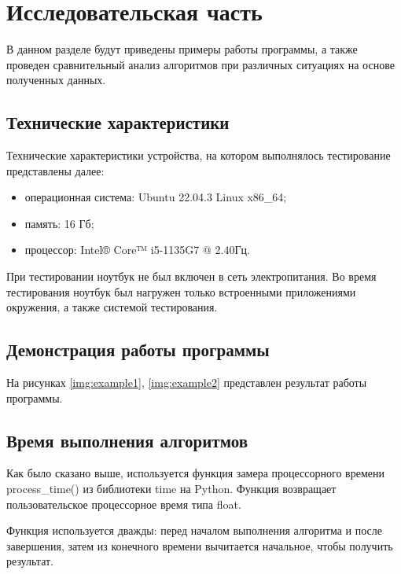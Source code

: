 \chapter{Исследовательская часть}

В данном разделе будут приведены примеры работы программы, а также проведен сравнительный анализ алгоритмов при различных ситуациях на основе полученных данных.

\section{Технические характеристики}

Технические характеристики устройства, на котором выполнялось тестирование представлены далее:

\begin{itemize}
    \item операционная система: Ubuntu 22.04.3 \cite{ubuntu} Linux \cite{linux} x86\_64;
    \item память: 16 Гб;
    \item процессор: Intel® Core™ i5-1135G7 @ 2.40Гц.
\end{itemize}

При тестировании ноутбук не был включен в сеть электропитания. Во время тестирования ноутбук был нагружен только встроенными приложениями окружения, а также системой тестирования.

\section{Демонстрация работы программы}

На рисунках \ref{img:example1}, \ref{img:example2} представлен результат работы программы.




\section{Время выполнения алгоритмов}

Как было сказано выше, используется функция замера процессорного времени process\_time() из библиотеки time на Python. Функция возвращает пользовательское процессорное время типа float.

Функция используется дважды: перед началом выполнения алгоритма и после завершения, затем из конечного времени вычитается начальное, чтобы получить результат.


